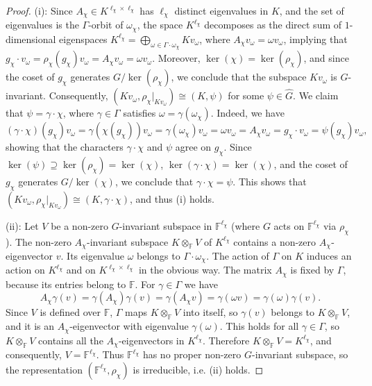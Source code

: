 \documentclass[10pt,a4paper]{amsart}
\def\FF{\mathbb{F}}
\def\field{K}
\begin{document}
\begin{proof} 
(i): Since $A_\chi\in \field^{\ell_\chi\times\ell_\chi}$ has $\ell_\chi$ distinct eigenvalues in $\field$, and the set of eigenvalues 
is the $\Gamma$-orbit of $\omega_\chi$, the space $\field^{\ell_\chi}$ decomposes as the direct sum of $1$-dimensional eigenspaces 
$\field^{\ell_\chi}=\bigoplus_{\omega\in \Gamma\cdot \omega_\chi}\field v_\omega$, 
where $A_\chi v_\omega=\omega v_\omega$, implying that 
$g_\chi \cdot v_\omega =\rho_\chi(g_\chi)v_\omega=A_\chi v_\omega=\omega v_\omega$.  
Moreover, $\ker(\chi)=\ker(\rho_\chi)$, and since the coset of $g_{\chi}$ generates $G/\ker(\rho_\chi)$, 
we conclude that the subspace $\field v_\omega$ is $G$-invariant. 
Consequently, $(\field v_\omega,\rho_\chi\vert_{\field v_\omega})\cong (\field,\psi)$ for some 
$\psi\in \widehat G$. We claim that $\psi=\gamma\cdot \chi$, where $\gamma\in \Gamma$ satisfies 
$\omega=\gamma(\omega_\chi)$. 
Indeed, we have 
\[(\gamma\cdot\chi)(g_\chi)v_\omega=\gamma(\chi(g_\chi))v_\omega
=\gamma(\omega_\chi)v_\omega
=\omega v_\omega=A_\chi v_\omega=g_\chi\cdot v_\omega=\psi(g_\chi)v_\omega,\] 
showing that the characters $\gamma\cdot \chi$ and $\psi$ agree on $g_\chi$. 
Since  $\ker(\psi)\supseteq \ker(\rho_\chi)=\ker(\chi)$,  
$\ker(\gamma\cdot \chi)=\ker(\chi)$, and the coset of $g_\chi$ generates $G/\ker(\chi)$, 
we conclude that $\gamma\cdot \chi=\psi$.  
This shows that $(\field v_\omega,\rho_\chi\vert_{\field v_\omega})\cong (\field,\gamma\cdot\chi)$, 
and thus (i) holds. 

  
(ii):  Let $V$ be a non-zero $G$-invariant subspace in $\FF^{\ell_\chi}$ (where $G$ acts on $\FF^{\ell_\chi}$ via $\rho_\chi$). 
The non-zero $A_\chi$-invariant subspace $\field\otimes_\FF V$  of $\field^{\ell_\chi}$ 
contains a non-zero $A_\chi$-eigenvector $v$. Its  
eigenvalue $\omega$ belongs to $\Gamma\cdot \omega_\chi$. 
The action of $\Gamma$ on $\field$ induces an action on 
$\field^{\ell_\chi}$ and on $\field^{\ell_\chi\times \ell_\chi}$ in the obvious way. The matrix $A_\chi$ is fixed by $\Gamma$, because its entries 
belong to $\FF$. For $\gamma\in\Gamma$ we have 
\begin{equation}\label{eq:gamma v}
A_\chi\gamma(v)=\gamma(A_\chi)\gamma(v)=
\gamma(A_\chi v)=
\gamma(\omega v)=\gamma(\omega)\gamma(v). 
\end{equation}   
Since $V$ is defined over $\FF$, 
$\Gamma$ maps $\field\otimes_\FF V$ into itself, so $\gamma(v)$ belongs to 
$\field\otimes_\FF V$, and it is an $A_\chi$-eigenvector with eigenvalue $\gamma(\omega)$. 
This holds for all $\gamma\in \Gamma$, so $\field\otimes_\FF V$ contains all the $A_\chi$-eigenvectors in 
$\field^{\ell_\chi}$.  
Therefore 
$\field\otimes_\FF V=\field^{\ell_\chi}$, and consequently, $V=\FF^{\ell_\chi}$.   
Thus $\FF^{\ell_\chi}$ has no proper non-zero $G$-invariant subspace, 
so the representation $(\FF^{\ell_\chi},\rho_\chi)$ is irreducible, i.e. (ii) holds. 


\end{proof}
\end{document}
